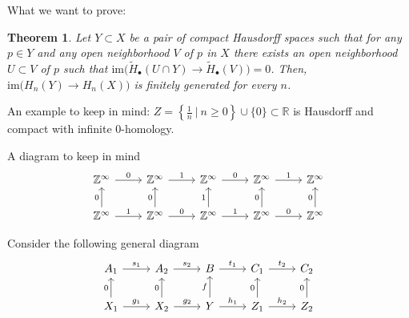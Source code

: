 \documentclass{amsart}
\newtheorem{theorem}{Theorem}
\newcommand{\im}{\mathrm{im}}
\newcommand{\Z}{\mathbb{Z}}
\begin{document}
	What we want to prove:
	\begin{theorem}
		Let $Y \subset X$ be a pair of compact Hausdorff spaces such that for any $p \in Y$ and any open neighborhood $V$ of $p$ in $X$ there exists an open neighborhood $U \subset V$ of $p$ such that $\im \big(\widetilde H_\bullet(U \cap Y) \to \widetilde H_\bullet(V)\big) = 0$. Then, $\im \big(H_n(Y) \to H_n(X)\big)$ is finitely generated for every $n$.
	\end{theorem}

	An example to keep in mind:
	$Z = \left\{\frac{1}{n}\ |\ n \geq 0\right\} \cup \{0\} \subset \mathbb R$ is Hausdorff and compact with infinite 0-homology.
	
	A diagram to keep in mind
	\begin{equation}
	\begin{tikzcd}
	\Z^{\infty} \arrow[r, "0"] & \Z^{\infty} \arrow[r, "1"] & \Z^{\infty} \arrow[r, "0"] & \Z^{\infty} \arrow[r, "1"] & \Z^{\infty} \\
	\Z^{\infty} \arrow[r, "1"] \arrow[u, "0"] & \Z^{\infty} \arrow[r, "0"] \arrow[u, "0"] & \Z^{\infty} \arrow[r, "1"] \arrow[u, "1"] & \Z^{\infty} \arrow[r, "0"] \arrow[u, "0"] & \Z^{\infty} \arrow[u, "0"]
	\end{tikzcd}
	\end{equation}
	
	Consider the following general diagram
	\begin{equation}
	\begin{tikzcd}
	A_1 \arrow[r, "s_1"] & A_2 \arrow[r, "s_2"] & B \arrow[r, "t_1"] & C_1 \arrow[r, "t_2"] & C_2 \\
	X_1 \arrow[r, "g_1"] \arrow[u, "0"] & X_2 \arrow[r, "g_2"] \arrow[u, "0"] & Y \arrow[r, "h_1"] \arrow[u, "f"] & Z_1 \arrow[r, "h_2"] \arrow[u, "0"] & Z_2 \arrow[u, "0"]
	\end{tikzcd}
	\end{equation}
\end{document}
